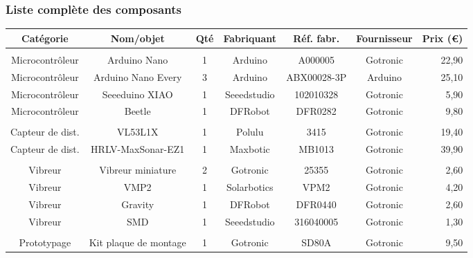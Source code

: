 \documentclass{beamer}
\begin{document}
\begin{frame}
\frametitle{Liste complète des composants}
\begin{center}
\begin{tiny}
\begin{tabular}{ccccccr}
\hline
{\bf Catégorie} & {\bf Nom/objet} & {\bf Qté} & {\bf Fabriquant} & {\bf Réf. fabr.} & {\bf Fournisseur} & {\bf Prix (€)} \\
\hline
 & & & & & & \\
Microcontrôleur & Arduino Nano & 1 & Arduino & A000005 & Gotronic & 22,90 \\
Microcontrôleur & Arduino Nano Every & 3 & Arduino & ABX00028-3P & Arduino & 25,10 \\
Microcontrôleur & Seeeduino XIAO & 1 & Seeedstudio & 102010328 & Gotronic & 5,90 \\
Microcontrôleur & Beetle & 1 & DFRobot & DFR0282 & Gotronic & 9,80 \\
 & & & & & & \\
Capteur de dist. & VL53L1X & 1 & Polulu & 3415 & Gotronic & 19,40 \\
Capteur de dist. & HRLV-MaxSonar-EZ1 & 1 & Maxbotic & MB1013 & Gotronic & 39,90 \\
 & & & & & & \\
Vibreur & Vibreur miniature & 2 & Gotronic & 25355 & Gotronic & 2,60 \\
Vibreur & VMP2 & 1 & Solarbotics & VPM2 & Gotronic & 4,20 \\
Vibreur & Gravity & 1 & DFRobot & DFR0440 & Gotronic & 2,60 \\
Vibreur & SMD & 1 & Seeedstudio & 316040005 & Gotronic & 1,30 \\
 & & & & & & \\
Prototypage & Kit plaque de montage & 1 & Gotronic & SD80A & Gotronic & 9,50 \\

\end{tabular}
\end{tiny}
\end{center}
\end{frame}
\end{document}
